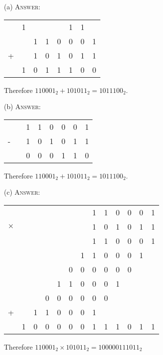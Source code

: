 
(a)
\textsc{Answer:}\vspace{-2mm}
\begin{answerlong}
\begin{longtable}{ccccc}
  & 1 &   &   &   & 1 & 1 &   \\
  &   & 1 & 1 & 0 & 0 & 0 & 1 \\
+ &   & 1 & 0 & 1 & 0 & 1 & 1 \\\hline
  & 1 & 0 & 1 & 1 & 1 & 0 & 0 \\\hline
\end{longtable}
Therefore $110001_{2} + 101011_{2} = 1011100_{2}$.
\end{answerlong}
  
(b)
\textsc{Answer:}\vspace{-2mm}
\begin{answerlong}
\begin{longtable}{ccccc}
  &   & 1 & 1 & 0 & 0 & 0 & 1 \\
- &   & 1 & 0 & 1 & 0 & 1 & 1 \\\hline
  &   & 0 & 0 & 0 & 1 & 1 & 0 \\\hline
\end{longtable}
Therefore $110001_{2} + 101011_{2} = 1011100_{2}$.
\end{answerlong}

(c)
\textsc{Answer:}\vspace{-2mm}
\begin{answerlong}
\begin{longtable}{cccccc}
         &   &   &   &   &   &   & 1 & 1 & 0 & 0 & 0 & 1 \\
$\times$ &   &   &   &   &   &   & 1 & 0 & 1 & 0 & 1 & 1 \\ \hline
         &   &   &   &   &   &   & 1 & 1 & 0 & 0 & 0 & 1 \\
         &   &   &   &   &   & 1 & 1 & 0 & 0 & 0 & 1 &   \\
         &   &   &   &   & 0 & 0 & 0 & 0 & 0 & 0 &   &   \\
         &   &   &   & 1 & 1 & 0 & 0 & 0 & 1 &   &   &   \\ \hline
         &   &   & 0 & 0 & 0 & 0 & 0 & 0 &   &   &   &   \\
       + &   & 1 & 1 & 0 & 0 & 0 & 1 &   &   &   &   &   \\\hline
         & 1 & 0 & 0 & 0 & 0 & 0 & 1 & 1 & 1 & 0 & 1 & 1 \\ \hline
\end{longtable}
Therefore $110001_{2} \times 101011_{2} = 100000111011_{2}$
\end{answerlong}
